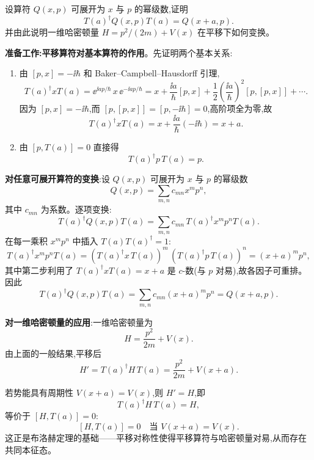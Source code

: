 \begin{question}
设算符 $Q(x,p)$ 可展开为 $x$ 与 $p$ 的幂级数,证明
\[
T(a)^\dagger Q(x,p)T(a)=Q(x+a,p).
\]
并由此说明一维哈密顿量 $H=p^2/(2m)+V(x)$ 在平移下如何变换。
\end{question}
\begin{solution}
	\textbf{准备工作:平移算符对基本算符的作用}。先证明两个基本关系:
	\begin{enumerate}
	\item 由 $[p,x]=-\ii\hbar$ 和 Baker--Campbell--Hausdorff 引理,
	\[
	T(a)^\dagger xT(a)=\ee^{\ii a p/\hbar}\,x\,\ee^{-\ii a p/\hbar}
	=x+\frac{\ii a}{\hbar}[p,x]+\frac12\left(\frac{\ii a}{\hbar}\right)^2[p,[p,x]]+\cdots.
	\]
	因为 $[p,x]=-\ii\hbar$,而 $[p,[p,x]]=[p,-\ii\hbar]=0$,高阶项全为零,故
	\[
	T(a)^\dagger xT(a)=x+\frac{\ii a}{\hbar}(-\ii\hbar)=x+a.
	\]
	\item 由 $[p,T(a)]=0$ 直接得
	\[
	T(a)^\dagger p\,T(a)=p.
	\]
	\end{enumerate}

	\textbf{对任意可展开算符的变换}:设 $Q(x,p)$ 可展开为 $x$ 与 $p$ 的幂级数
	\[
	Q(x,p)=\sum_{m,n}c_{mn}x^mp^n,
	\]
	其中 $c_{mn}$ 为系数。逐项变换:
	\[
	T(a)^\dagger Q(x,p)T(a)=\sum_{m,n}c_{mn}\,T(a)^\dagger x^m p^n T(a).
	\]
	在每一乘积 $x^m p^n$ 中插入 $T(a)T(a)^\dagger=1$:
	\[
	T(a)^\dagger x^m p^n T(a)=(T(a)^\dagger x\,T(a))^m\,(T(a)^\dagger p\,T(a))^n=(x+a)^m p^n,
	\]
	其中第二步利用了 $T(a)^\dagger x T(a)=x+a$ 是 $c$-数(与 $p$ 对易),故各因子可重排。因此
	\[
	T(a)^\dagger Q(x,p)T(a)=\sum_{m,n}c_{mn}(x+a)^mp^n=Q(x+a,p).
	\]

	\textbf{对一维哈密顿量的应用}:一维哈密顿量为
	\[
	H=\frac{p^2}{2m}+V(x).
	\]
	由上面的一般结果,平移后
	\[
	H'=T(a)^\dagger H\,T(a)=\frac{p^2}{2m}+V(x+a).
	\]

	若势能具有周期性 $V(x+a)=V(x)$,则 $H'=H$,即
	\[
	T(a)^\dagger H\,T(a)=H,
	\]
	等价于 $[H,T(a)]=0$:
	\[
	\boxed{[H,T(a)]=0\quad\text{当 }V(x+a)=V(x)}.
	\]
	这正是布洛赫定理的基础——平移对称性使得平移算符与哈密顿量对易,从而存在共同本征态。
	\end{solution}

